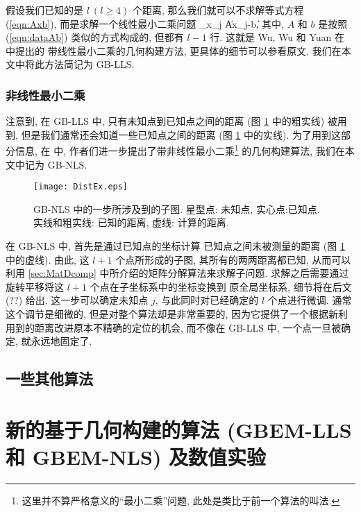 \documentclass{CASthesis_zzk}
\begin{document}
假设我们已知的是 $l ~(l\geq 4)$ 个距离, 
那么我们就可以不求解等式方程 (\ref{eqn:Axb}), 
而是求解一个线性最小二乘问题
\be \min_{x_j} \|Ax_j-b\|, \ee
其中, $A$ 和 $b$ 是按照 (\ref{eqn:dataAb}) 类似的方式构成的, 
但都有 $l-1$ 行. 
这就是 Wu, Wu 和 Yuan 在 \cite{Wu2008} 中提出的
带线性最小二乘的几何构建方法, 更具体的细节可以参看原文.
我们在本文中将此方法简记为 GB-LLS.

\subsection{非线性最小二乘}\label{NLS}
注意到, 在 GB-LLS 中, 只有未知点到已知点之间的距离
(图 \ref{fig:DistEx} 中的粗实线) 被用到,
但是我们通常还会知道一些已知点之间的距离 (图 \ref{fig:DistEx} 中的实线). 
为了用到这部分信息, 在 \cite{Wu2008} 中, 
作者们进一步提出了带非线性最小二乘\footnote{这里并不算严格意义的``最小二乘''问题, 此处是类比于前一个算法的叫法.}
的几何构建算法, 我们在本文中记为 GB-NLS.

\begin{figure}[htb!]
  \centering
  \texttt{[image: DistEx.eps]}\\
  \caption{GB-NLS 中的一步所涉及到的子图. 星型点: 未知点, 实心点:已知点.
  实线和粗实线: 已知的距离, 虚线: 计算的距离.}\label{fig:DistEx}
\end{figure}

在 GB-NLS 中, 首先是通过已知点的坐标计算
已知点之间未被测量的距离 (图 \ref{fig:DistEx} 中的虚线).
由此, 这 $l+1$ 个点所形成的子图, 其所有的两两距离都已知, 
从而可以利用 \ref{sec:MatDcomp} 中所介绍的矩阵分解算法来求解子问题.
求解之后需要通过旋转平移将这 $l+1$ 个点在子坐标系中的坐标变换到
原全局坐标系, 细节将在后文 (??) 给出.
这一步可以确定未知点 $j$, 与此同时对已经确定的 $l$ 个点进行微调. 
通常这个调节是细微的, 但是对整个算法却是非常重要的,
因为它提供了一个根据新利用到的距离改进原本不精确的定位的机会,
而不像在 GB-LLS 中, 一个点一旦被确定, 就永远地固定了.


\section{一些其他算法}
\label{sec:otheralg}



\chapter{新的基于几何构建的算法 (GBEM-LLS 和 GBEM-NLS) 及数值实验}
\label{cha:ouralg}
\end{document}
